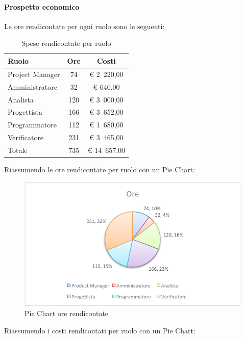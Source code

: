 			\paragraph{Prospetto economico}
				Le ore rendicontate per ogni ruolo sono le seguenti:
				\begin{table}[H]
					\begin{center}
						\begin{tabular}{| l | c | c |}
							\hline
							Ruolo 			& Ore 		& Costi  \\ \hline
							
							Project Manager	& 74 			& \euro{} 2~220,00 	\\
							Amministratore 		& 32 			& \euro{} 640,00 	\\
							Analista	 		& 120 		& \euro{} 3~000,00 	\\
							Progettista 		& 166 		& \euro{} 3~652,00  	\\
							Programmatore		& 112 		& \euro{} 1~680,00 	\\
							Verificatore		& 231 		& \euro{} 3~465,00 	\\ \hline \hline
							
							Totale	 		& 735 		& \euro{} 14~657,00 	\\ \hline
						\end{tabular}
					\end{center}
					\caption{Spese rendicontate per ruolo}
				\end{table}
				Riassumendo le ore rendicontate per ruolo con un Pie Chart:
				\begin{figure}[H]\centering
					\includegraphics[width=\textwidth]{PianoDiProgetto/Pics/ChartTotOreRendic.pdf}
					\caption{Pie Chart ore rendicontate}
				\end{figure}
				Riassumendo i costi rendicontati per ruolo con un Pie Chart:
